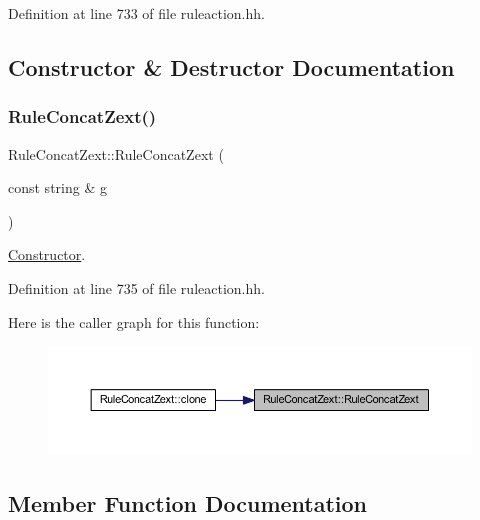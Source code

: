 Definition at line 733 of file ruleaction.\+hh.



\subsection{Constructor \& Destructor Documentation}
\mbox{\label{class_rule_concat_zext_a8fd5a5c05631f85a6d518f5cb25a2cd0}} 
\subsubsection{\texorpdfstring{RuleConcatZext()}{RuleConcatZext()}}
{\footnotesize\ttfamily Rule\+Concat\+Zext\+::\+Rule\+Concat\+Zext (\begin{DoxyParamCaption}\item[{const string \&}]{g }\end{DoxyParamCaption})\hspace{0.3cm}{\ttfamily [inline]}}



\mbox{\hyperlink{class_constructor}{Constructor}}. 



Definition at line 735 of file ruleaction.\+hh.

Here is the caller graph for this function\+:
\nopagebreak
\begin{figure}[H]
\begin{center}
\leavevmode
\includegraphics[width=350pt]{class_rule_concat_zext_a8fd5a5c05631f85a6d518f5cb25a2cd0_icgraph}
\end{center}
\end{figure}


\subsection{Member Function Documentation}
\mbox{\label{class_rule_concat_zext_aa7e8b70ac971efc988253c8b42e080b7}} 
